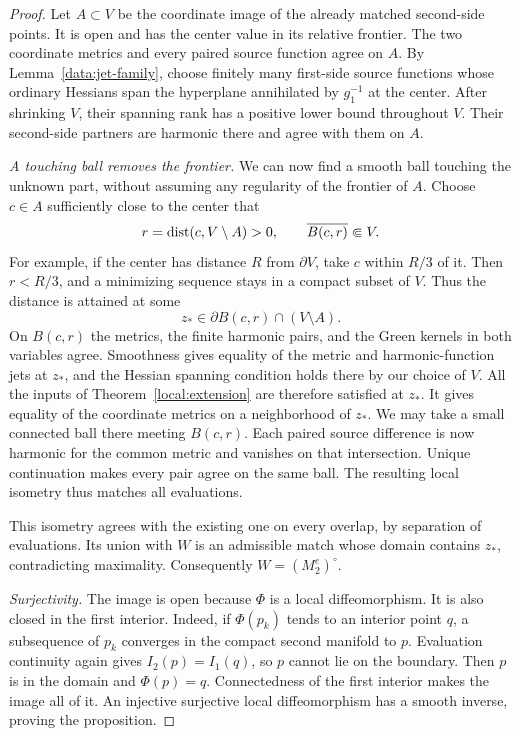 \begin{proof}
Let $A\subset V$ be the coordinate image of the already matched
second-side points. It is open and has the center value in its
relative frontier. The two coordinate metrics and every paired
source function agree on $A$. By Lemma~\ref{data:jet-family},
choose finitely many first-side source functions whose ordinary
Hessians span the hyperplane annihilated by $g_1^{-1}$ at the
center. After shrinking $V$, their spanning rank has a positive
lower bound throughout $V$. Their second-side partners are
harmonic there and agree with them on $A$.

\emph{A touching ball removes the frontier.}\quad
We can now find a smooth ball touching the unknown part, without
assuming any regularity of the frontier of $A$. Choose $c\in A$
sufficiently close to the center that
\[
 r=\operatorname{dist}(c,V\setminus A)>0,\qquad
 \overline{B(c,r)}\Subset V.
\]
For example, if the center has distance $R$ from $\partial V$,
take $c$ within $R/3$ of it. Then $r<R/3$, and a minimizing
sequence stays in a compact subset of $V$. Thus the distance is
attained at some
\[
 z_*\in\partial B(c,r)\cap(V\setminus A).
\]
On $B(c,r)$ the metrics, the finite harmonic pairs, and the Green
kernels in both variables agree. Smoothness gives equality of
the metric and harmonic-function jets at $z_*$, and the Hessian spanning
condition holds there by our choice of $V$. All the inputs of
Theorem~\ref{local:extension} are therefore satisfied at $z_*$.
It gives equality of the coordinate metrics on a neighborhood of
$z_*$. We may take a small connected ball there meeting $B(c,r)$.
Each paired source difference is now harmonic for the common
metric and vanishes on that intersection. Unique continuation
makes every pair agree on the same ball. The resulting local
isometry thus matches all evaluations.

This isometry agrees with the existing one on every overlap, by
separation of evaluations. Its union with $W$ is an admissible
match whose domain contains $z_*$, contradicting maximality.
Consequently $W=(M_2^e)^\circ$.

\emph{Surjectivity.}\quad
The image is open because $\Phi$ is a local diffeomorphism. It is
also closed in the first interior. Indeed, if $\Phi(p_k)$ tends
to an interior point $q$, a subsequence of $p_k$ converges in
the compact second manifold to $p$. Evaluation continuity again
gives $I_2(p)=I_1(q)$, so $p$ cannot lie on the boundary. Then
$p$ is in the domain and $\Phi(p)=q$. Connectedness of the first
interior makes the image all of it. An injective surjective local
diffeomorphism has a smooth inverse, proving the proposition.
\end{proof}

